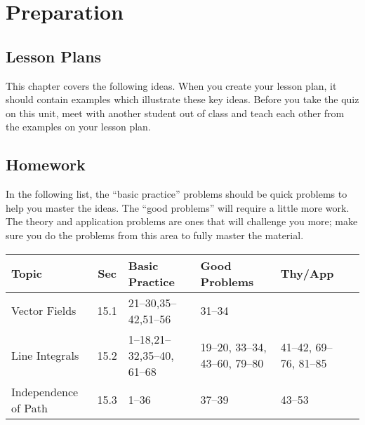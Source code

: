 \section{Preparation}

\subsection{Lesson Plans}

This chapter covers the following ideas. When you create your lesson plan, it should contain examples which illustrate these key ideas. Before you take the quiz on this unit, meet with another student out of class and teach each other from the examples on your lesson plan. 





\subsection{Homework}

In the following list, the ``basic practice'' problems should be quick
problems to help you master the ideas.  The ``good problems'' will
require a little more work.  The theory and application problems are
ones that will challenge you more; make sure you do the problems from
this area to fully master the material.  

{\noindent %
\begin{tabular}{|l|c|l|l|l|l|}\hline
Topic &Sec &Basic Practice &Good Problems &Thy/App \\\hline
Vector Fields & 15.1&21--30,35--42,51--56 & 31--34& \\\hline
Line Integrals & 15.2&1--18,21--32,35--40, 61--68 & 19--20, 33--34, 43--60, 79--80 & 41--42, 69--76, 81--85\\\hline
Independence of Path & 15.3&1--36 & 37--39& 43--53\\\hline
\end{tabular}

}




